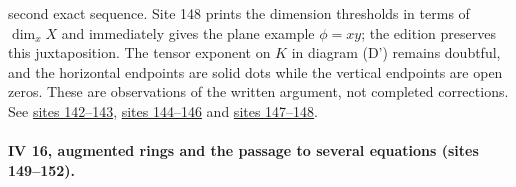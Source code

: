 second exact sequence. Site 148 prints the dimension thresholds in terms of $\dim_x X$ and immediately gives the plane example $\phi=xy$; the edition preserves this juxtaposition. The tensor exponent on $K$ in diagram (D') remains doubtful, and the horizontal endpoints are solid dots while the vertical endpoints are open zeros. These are observations of the written argument, not completed corrections. See \href{https://grothendieck.umontpellier.fr/web/viewer.html?file=../25.pdf#page=143}{sites 142--143}, \href{https://grothendieck.umontpellier.fr/web/viewer.html?file=../25.pdf#page=145}{sites 144--146} and \href{https://grothendieck.umontpellier.fr/web/viewer.html?file=../25.pdf#page=148}{sites 147--148}.

\paragraph{IV 16, augmented rings and the passage to several equations (sites 149--152).}
